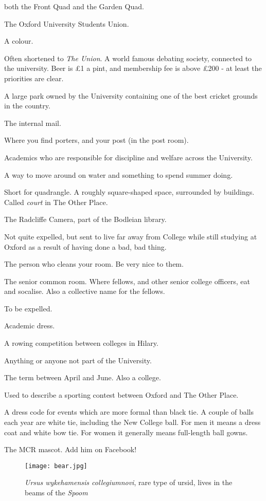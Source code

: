 \begin{description}
both the Front Quad and the Garden Quad.
\item[OUSU] The Oxford University Students Union.
\item[Oxford Blue] A colour.
\item[Oxford Union] Often shortened to \emph{The Union}. A world famous debating
society, connected to the university. Beer is \pounds1 a pint, and membership
fee is above \pounds200 - at least the priorities are clear.
\item[The University Parks] A large park owned by the University containing one
of the best cricket grounds in the country.
\item[Pigeon post] The internal mail. 
\item[Porters' lodge] Where you find porters, and your post (in the post room). 
\item[Proctors] Academics who are responsible for discipline and welfare across
the University.
\item[Punting] A way to move around on water and something to spend summer
doing.
\item[Quad] Short for quadrangle. A roughly square-shaped space, surrounded by
buildings. Called \emph{court} in The Other Place.
\item[Rad Cam] The Radcliffe Camera, part of the Bodleian library. 
\item[Rustication] Not quite expelled, but sent to live far away from College
while still studying at Oxford as a result of having done a bad, bad thing. 
\item[Scout] The person who cleans your room. Be very nice to them.
\item[SCR] The senior common room. Where fellows, and other senior college
officers, eat and socalise. Also a collective name for the fellows.
\item[Sent down] To be expelled. 
\item[Sub fusc] Academic dress. 
\item[Torpids] A rowing competition between colleges in Hilary. 
\item[Town] Anything or anyone not part of the University. 
\item[Trinity] The term between April and June. Also a college. 
\item[Varsity] Used to describe a sporting contest between Oxford and The Other
Place.
\item[White tie] A dress code for events which are more formal than black tie. A
couple of balls each year are white tie, including the New College ball. For men it means a dress coat and white bow tie. For women it generally means full-length ball gowns.
\item[Wykkie Bear] The MCR mascot. Add him on Facebook!
\end{description}

\begin{figure}[htbp]
\centering
\texttt{[image: bear.jpg]}
\caption[]{\emph{Ursus
wykehamensis collegiumnovi}, rare type of ursid, lives in the beams of
the \emph{Spoom}}
\label{fig:bear}
\end{figure}